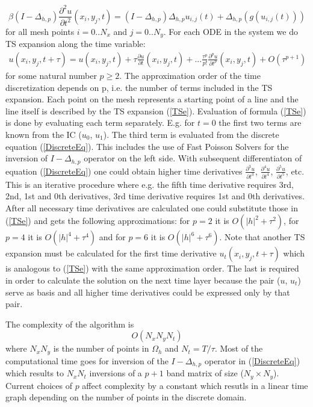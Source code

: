 \documentclass{article}
\newcommand{\be}{\begin{equation}}
\newcommand{\ee}{\end{equation}}
\newcommand{\rf}[1]{(\ref{#1})}
\begin{document}
\be \label{DiscreteEq}
\beta (I-\Delta_{h,p}) \frac{\partial^2 u}{\partial t^2}(x_i, y_j, t)=
 (I - \Delta_{h,p})\Delta_{h,p} u_{i, j}(t) + \Delta_{h,p} ( g( u_{i, j}(t) ) )
\ee
for all mesh points $i = 0..N_x$ and $j=0..N_y$. For each ODE in the system we do TS expansion along the time variable:
\begin{align} \label{TSe}
u(x_i, y_j, t+\tau) = u(x_i, y_j, t) + \tau \frac{ \partial u }{ \partial t }(x_i, y_j, t)  + ... 
\frac{ \tau^p }{ p! } \frac{ \partial^p u }{ \partial t^p }(x_i, y_j, t) + O(\tau^{p+1})
\end{align}
for some natural number $p \ge 2$. The approximation order of the time discretization depends on p, i.e. the number of terms included in the TS expansion. Each point on the mesh represents a starting point of a line and the line itself is described by the TS expansion \rf{TSe}. Evaluation of formula \rf{TSe} is done by evaluating each term separately. E.g. for $t=0$ the first two terms are known from the IC ($u_0$, $u_1$). The third term is evaluated from the discrete equation \rf{DiscreteEq}. This includes the use of Fast Poisson Solvers for the inversion of $I-\Delta_{h,p}$ operator on the left side. With subsequent differentiaton of equation \rf{DiscreteEq} one could obtain higher time derivatives $\frac{\partial^3 u}{\partial t^3}$, $\frac{\partial^4 u}{\partial t^4}$, $\frac{\partial^5 u}{\partial t^5}$, etc. This is an iterative procedure where e.g. the fifth time derivative requires 3rd, 2nd, 1st and 0th derivatives, 3rd time derivative requires 1st and 0th derivatives. After all necessary time derivatives are calculated one could substitute those in \rf{TSe} and gets the following approximations: for $p=2$ it is $O(|h|^2 + \tau^2)$, for $p=4$ it is $O(|h|^4 + \tau^4)$ and for $p=6$ it is $O(|h|^6 + \tau^6)$. Note that another TS expansion must be calculated for the first time derivative $u_t(x_i, y_j, t+\tau)$ which is analogous to \rf{TSe} with the same approximation order. The last is required in order to calculate the solution on the next time layer because the pair ($u$, $u_t$) serve as basis and all higher time derivatives could be expressed only by that pair.

The complexity of the algorithm is
$$ O( N_x N_y N_t ) $$
where $N_x N_y$ is the number of points in $\Omega_h$ and $N_t = T/\tau$. Most of the computational time goes for inversion of the $I-\Delta_{h,p}$ operator in \rf{DiscreteEq} which results to $N_x N_t$ inversions of a $p+1$ band matrix of size ($N_y \times N_y$). Current choices of $p$ affect complexity by a constant which resutls in a linear time graph depending on the number of points in the discrete domain.
\end{document}
